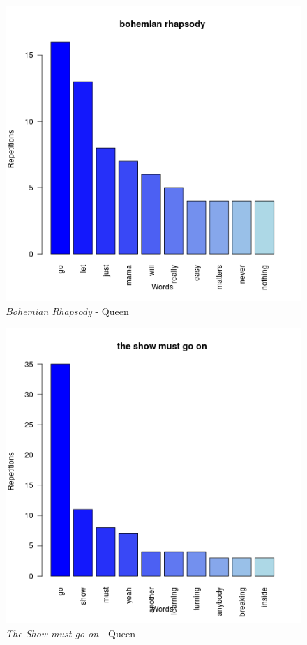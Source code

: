\begin{figure}[!h]
	\centering
	\includegraphics[width=0.7\linewidth]{Imagenes/bohemianrhapsody}
	\caption{\textit{Bohemian Rhapsody} - Queen}
	\label{fig:bohemianrhapsody}
\end{figure}
\begin{figure}[!h]
	\centering
	\includegraphics[width=0.7\linewidth]{Imagenes/theshowmustgoon}
	\caption{\textit{The Show must go on} - Queen}
	\label{fig:tsmgo}
\end{figure}




